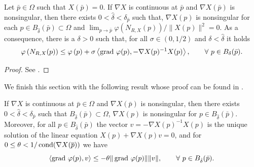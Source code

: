 \begin{lemma}\label{Le:SupLinConPhi}
Let  $\bar{p}\in \Omega$ such that $X(\bar p)=0$.  If $\nabla X$ is continuous at $\bar p$ and $\nabla X(\bar p)$ is nonsingular,  then  there exists $0<\hat{\delta}<\delta_{\bar{p}}$ such that, $\nabla X(p)$ is nonsingular  for each $p\in B_{\hat{\delta}}(\bar{p}) \subset \Omega$ and $\lim_{p\to \bar p}\varphi\left(N_{R,X}(p)\right)/\parallel X(p)\parallel^{2}=0$. As a consequence, there is a $\delta>0$ such that,  for all  $\sigma\in(0,1/2)$ and $\delta< \hat{\delta}$  it holds
\begin{equation}\label{eq:ArmijoCond} \nonumber
\varphi\left(N_{R,X}(p)\right) \leq \varphi\left(p\right)+ \sigma \left\langle\operatorname{grad}\,\varphi(p), -\nabla X(p)^{-1}X(p)\right\rangle, \qquad  \forall~p\in B_{\delta}(\bar{p}).
\end{equation}
\end{lemma}
\begin{proof}
See \cite[Lemma 4.3]{bortoloti2022efficient}.
\end{proof}
\noindent We finish this section with the following result whose proof can be found in \cite[Lemma 4.2]{bortoloti2022efficient}.
\begin{lemma}\label{Le:AdTesteNew}
 If $\nabla X$ is continuous at $\bar p\in \Omega$ and $\nabla X(\bar p)$ is nonsingular,  then  there exists $0<\hat{\delta}<\delta_{\bar{p}}$ such that $B_{\hat{\delta}}(\bar{p})\subset \Omega$, $\nabla X(p)$ is nonsingular  for  $p\in B_{\hat{\delta}}(\bar{p})$.  Moreover, for all  $p\in B_{\hat{\delta}}(\bar{p})$  the vector $v=-\nabla X(p)^{-1}X(p)$ is the  unique solution of the linear equation  $X(p)+\nabla X(p)v=0$,   and for $0\leq \theta < 1/\operatorname{cond} (\nabla X(\overline{p}))$  we have
\begin{equation}\label{eq:AdTesteNew} \nonumber
\langle \operatorname{grad}\,\varphi(p), v \rangle \leq -{\theta}\|\operatorname{grad}\, \varphi(p)\| \| v\|, \qquad \forall ~p\in B_{\hat{\delta}}(\bar{p}).
\end{equation}
\end{lemma}




